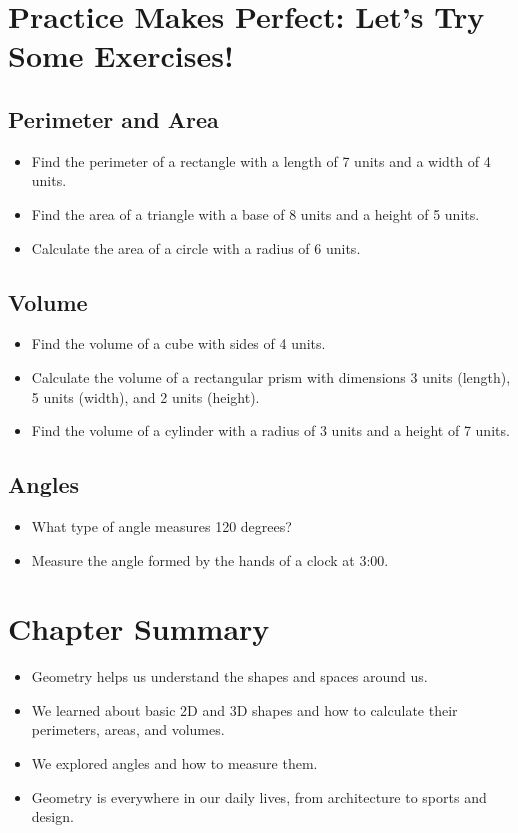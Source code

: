 \section{Practice Makes Perfect: Let’s Try Some Exercises!}
\subsection{Perimeter and Area}
\begin{itemize}
    \item Find the perimeter of a rectangle with a length of 7 units and a width of 4 units.
    \item Find the area of a triangle with a base of 8 units and a height of 5 units.
    \item Calculate the area of a circle with a radius of 6 units.
\end{itemize}

\subsection{Volume}
\begin{itemize}
    \item Find the volume of a cube with sides of 4 units.
    \item Calculate the volume of a rectangular prism with dimensions 3 units (length), 5 units (width), and 2 units (height).
    \item Find the volume of a cylinder with a radius of 3 units and a height of 7 units.
\end{itemize}

\subsection{Angles}
\begin{itemize}
    \item What type of angle measures 120 degrees?
    \item Measure the angle formed by the hands of a clock at 3:00.
\end{itemize}

\section{Chapter Summary}
\begin{itemize}
    \item Geometry helps us understand the shapes and spaces around us.
    \item We learned about basic 2D and 3D shapes and how to calculate their perimeters, areas, and volumes.
    \item We explored angles and how to measure them.
    \item Geometry is everywhere in our daily lives, from architecture to sports and design.
\end{itemize}

